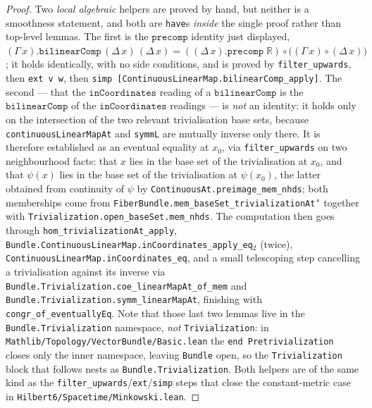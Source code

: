 \begin{proof}
    Two \emph{local algebraic} helpers are proved by hand, but neither is a smoothness statement, and both are \texttt{have}s \emph{inside} the single proof rather than top-level lemmas. The first is the $\mathtt{precomp}$ identity just displayed, $(\Gamma\,x).\mathtt{bilinearComp}\,(\Delta\,x)\,(\Delta\,x) = ((\Delta\,x).\mathtt{precomp}\;\mathbb{R}) \circ \big((\Gamma\,x) \circ (\Delta\,x)\big)$; it holds identically, with no side conditions, and is proved by \texttt{filter\_upwards}, then \texttt{ext v w}, then \texttt{simp [ContinuousLinearMap.bilinearComp\_apply]}. The second --- that the $\mathtt{inCoordinates}$ reading of a $\mathtt{bilinearComp}$ is the $\mathtt{bilinearComp}$ of the $\mathtt{inCoordinates}$ readings --- is \emph{not} an identity: it holds only on the intersection of the two relevant trivialisation base sets, because \texttt{continuousLinearMapAt} and \texttt{symmL} are mutually inverse only there. It is therefore established as an eventual equality at $x_0$, via \texttt{filter\_upwards} on two neighbourhood facts: that $x$ lies in the base set of the trivialisation at $x_0$, and that $\psi(x)$ lies in the base set of the trivialisation at $\psi(x_0)$, the latter obtained from continuity of $\psi$ by \texttt{ContinuousAt.preimage\_mem\_nhds}; both memberships come from \texttt{FiberBundle.mem\_baseSet\_trivializationAt'} together with \texttt{Trivialization.open\_baseSet.mem\_nhds}. The computation then goes through \texttt{hom\_trivializationAt\_apply}, \texttt{Bundle.ContinuousLinearMap.inCoordinates\_apply\_eq\ensuremath{_2}} (twice), \texttt{ContinuousLinearMap.inCoordinates\_eq}, and a small telescoping step cancelling a trivialisation against its inverse via \texttt{Bundle.Trivialization.coe\_linearMapAt\_of\_mem} and \texttt{Bundle.Trivialization.symm\_linearMapAt}, finishing with \texttt{congr\_of\_eventuallyEq}. Note that those last two lemmas live in the \texttt{Bundle.Trivialization} namespace, \emph{not} \texttt{Trivialization}: in \texttt{Mathlib/Topology/VectorBundle/Basic.lean} the \texttt{end Pretrivialization} closes only the inner namespace, leaving \texttt{Bundle} open, so the \texttt{Trivialization} block that follows nests as \texttt{Bundle.Trivialization}. Both helpers are of the same kind as the \texttt{filter\_upwards}/\texttt{ext}/\texttt{simp} steps that close the constant-metric case in \texttt{Hilbert6/Spacetime/Minkowski.lean}.


\end{proof}

